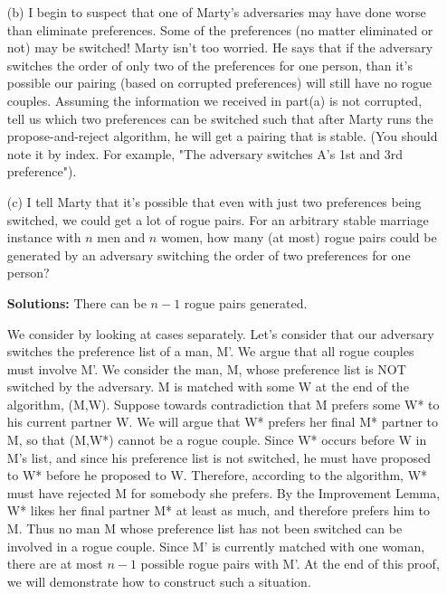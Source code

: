 \documentclass[11pt]{article}
\newif\ifsolutions
\renewcommand{\answer}[1]{{\color{mydarkblue}\textbf{Solutions: }#1}}
\begin{document}
\begin{qunlist}
\begin{itemize}
\newpage
        
\item[(b)] I begin to suspect that one of Marty's adversaries may have done worse than eliminate preferences. 
Some of the preferences (no matter eliminated or not) may be switched! Marty isn't too worried. 
He says that if the adversary switches the order of only two of the preferences for one person, 
than it's possible our pairing (based on corrupted preferences) will still have no rogue couples. 
Assuming the information we received in part(a) is not corrupted, 
tell us which two preferences can be switched such that after Marty runs the propose-and-reject algorithm, 
he will get a pairing that is stable. 
(You should note it by index. For example, "The adversary switches A's 1st and 3rd preference").

\ifsolutions
\answer{
There are three solutions. 
Either Man 2's 2nd and 3rd preference, Man 3's 2nd and 3rd preference can be switched, 
or Woman C's 1st and 2nd preferences can be switched. 
If any of these three sets of swithes occur, the algorithm will still return no rogue couples. 
This questions is meant as an elaboration on the previous part in order to 
get you to think about how some parts of preference lists 
may not actually affect the outcome of the traditional propose-and-reject algorithm.
}
\fi

        
\item[(c)] I tell Marty that it's possible that even with just two preferences being switched, 
we could get a lot of rogue pairs. For an arbitrary stable marriage instance with $n$ men and $n$ women, 
how many (at most) rogue pairs could be generated 
by an adversary switching the order of two preferences for one person?

\ifsolutions
\answer{
There can be $n-1$ rogue pairs generated. 

We consider by looking at cases separately. 
Let's consider that our adversary switches the preference list of a man, M'. 
We argue that all rogue couples must involve M'.
We consider the man, M, whose preference list is NOT switched by the adversary. 
M is matched with some W at the end of the algorithm, (M,W). 
Suppose towards contradiction that M prefers some W* to his current partner W. 
We will argue that W* prefers her final M* partner to M, so that (M,W*) cannot be a rogue couple.  Since W* occurs before W in M's list, and since his preference list is not switched, 
he must have proposed to W* before he proposed to W. 
Therefore, according to the algorithm, W* must have rejected M for somebody she prefers. 
By the Improvement Lemma, W* likes her final partner M* at least as much, and therefore prefers him to M.
Thus no man M whose preference list has not been switched can be involved in a rogue couple. 
Since M' is currently matched with one woman, there are at most $n-1$ possible rogue pairs with M'. 
At the end of this proof, we will demonstrate how to construct such a situation. 

}
\end{itemize}
\end{qunlist}
\end{document}
